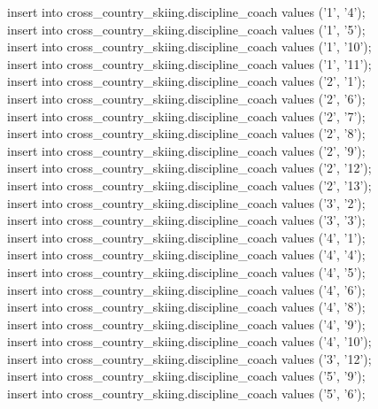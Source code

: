 \documentclass[a4paper,12pt]{article}
\begin{document}
insert into cross\_country\_skiing.discipline\_coach values ('1', '4');\\
insert into cross\_country\_skiing.discipline\_coach values ('1', '5');\\
insert into cross\_country\_skiing.discipline\_coach values ('1', '10');\\
insert into cross\_country\_skiing.discipline\_coach values ('1', '11');\\
insert into cross\_country\_skiing.discipline\_coach values ('2', '1');\\
insert into cross\_country\_skiing.discipline\_coach values ('2', '6');\\
insert into cross\_country\_skiing.discipline\_coach values ('2', '7');\\
insert into cross\_country\_skiing.discipline\_coach values ('2', '8');\\
insert into cross\_country\_skiing.discipline\_coach values ('2', '9');\\
insert into cross\_country\_skiing.discipline\_coach values ('2', '12');\\
insert into cross\_country\_skiing.discipline\_coach values ('2', '13');\\
insert into cross\_country\_skiing.discipline\_coach values ('3', '2');\\
insert into cross\_country\_skiing.discipline\_coach values ('3', '3');\\
insert into cross\_country\_skiing.discipline\_coach values ('4', '1');\\
insert into cross\_country\_skiing.discipline\_coach values ('4', '4');\\
insert into cross\_country\_skiing.discipline\_coach values ('4', '5');\\
insert into cross\_country\_skiing.discipline\_coach values ('4', '6');\\
insert into cross\_country\_skiing.discipline\_coach values ('4', '8');\\
insert into cross\_country\_skiing.discipline\_coach values ('4', '9');\\
insert into cross\_country\_skiing.discipline\_coach values ('4', '10');\\
insert into cross\_country\_skiing.discipline\_coach values ('3', '12');\\
insert into cross\_country\_skiing.discipline\_coach values ('5', '9');\\
insert into cross\_country\_skiing.discipline\_coach values ('5', '6');\\
\end{document}
